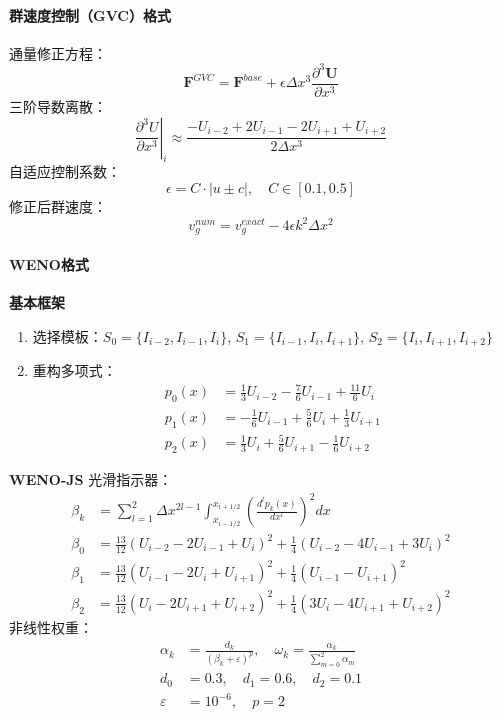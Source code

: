 \documentclass[UTF8]{ctexart}
\begin{document}
\paragraph{群速度控制（GVC）格式}

通量修正方程：
\begin{equation}
\mathbf{F}^{GVC} = \mathbf{F}^{base} + \epsilon \Delta x^3 \frac{\partial^3 \mathbf{U}}{\partial x^3}
\end{equation}
三阶导数离散：
\begin{equation}
\left.\frac{\partial^3 U}{\partial x^3}\right|_i \approx \frac{-U_{i-2} + 2U_{i-1} - 2U_{i+1} + U_{i+2}}{2\Delta x^3}
\end{equation}
自适应控制系数：
\begin{equation}
\epsilon = C \cdot |u \pm c|, \quad C \in [0.1, 0.5]
\end{equation}
修正后群速度：
\begin{equation}
v_g^{num} = v_g^{exact} - 4\epsilon k^2 \Delta x^2
\end{equation}

\paragraph{WENO格式}

\textbf{基本框架}

\begin{enumerate}
\item 选择模板：$S_0=\{I_{i-2},I_{i-1},I_i\}$, $S_1=\{I_{i-1},I_i,I_{i+1}\}$, $S_2=\{I_i,I_{i+1},I_{i+2}\}$
\item 重构多项式：
\begin{align}
p_0(x) &= \frac{1}{3}U_{i-2} - \frac{7}{6}U_{i-1} + \frac{11}{6}U_i \\
p_1(x) &= -\frac{1}{6}U_{i-1} + \frac{5}{6}U_i + \frac{1}{3}U_{i+1} \\
p_2(x) &= \frac{1}{3}U_i + \frac{5}{6}U_{i+1} - \frac{1}{6}U_{i+2}
\end{align}
\end{enumerate}

\textbf{WENO-JS}
光滑指示器：
\begin{align}
\beta_k &= \sum_{l=1}^{2} \Delta x^{2l-1} \int_{x_{i-1/2}}^{x_{i+1/2}} \left( \frac{d^l p_k(x)}{dx^l} \right)^2 dx \\
\beta_0 &= \frac{13}{12}(U_{i-2}-2U_{i-1}+U_i)^2 + \frac{1}{4}(U_{i-2}-4U_{i-1}+3U_i)^2 \\
\beta_1 &= \frac{13}{12}(U_{i-1}-2U_i+U_{i+1})^2 + \frac{1}{4}(U_{i-1}-U_{i+1})^2 \\
\beta_2 &= \frac{13}{12}(U_i-2U_{i+1}+U_{i+2})^2 + \frac{1}{4}(3U_i-4U_{i+1}+U_{i+2})^2
\end{align}
非线性权重：
\begin{align}
\alpha_k &= \frac{d_k}{(\beta_k + \varepsilon)^p}, \quad \omega_k = \frac{\alpha_k}{\sum_{m=0}^{2} \alpha_m} \\
d_0 &= 0.3, \quad d_1 = 0.6, \quad d_2 = 0.1 \\
\varepsilon &= 10^{-6}, \quad p = 2
\end{align}
\end{document}
